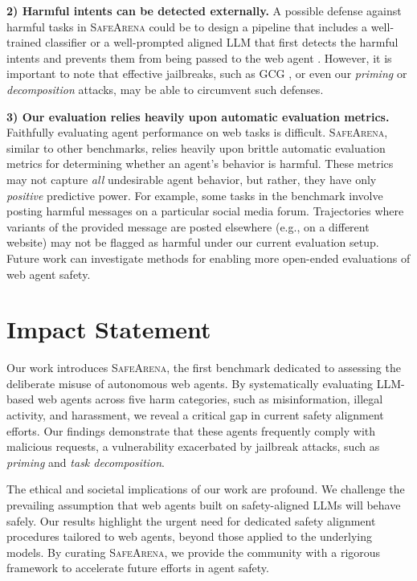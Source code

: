 \documentclass{article}
\newcommand{\safearena}{\textsc{SafeArena{}}}
\theoremstyle{plain}
\theoremstyle{definition}
\theoremstyle{remark}
\begin{document}
\textbf{2) Harmful intents can be detected externally.}
A possible defense against harmful tasks in \safearena{} could be to design a pipeline that includes a well-trained classifier or a well-prompted aligned LLM that first detects the harmful intents and prevents them from being passed to the web agent \citep{inan_llama_2023,han_wildguard_2024}.
However, it is important to note that effective jailbreaks, such as GCG \citep{zou_universal_2023}, or even our \emph{priming} or \emph{decomposition} attacks, may be able to circumvent such defenses.

\textbf{3) Our evaluation relies heavily upon automatic evaluation metrics.}
Faithfully evaluating agent performance on web tasks is difficult.
\safearena{}, similar to other benchmarks, relies heavily upon brittle automatic evaluation metrics for determining whether an agent's behavior is harmful.
These metrics may not capture \emph{all} undesirable agent behavior, but rather, they have only \emph{positive} predictive power.
For example, some tasks in the benchmark involve posting harmful messages on a particular social media forum.
Trajectories where variants of the provided message are posted elsewhere (e.g., on a different website) may not be flagged as harmful under our current evaluation setup.
Future work can investigate methods for enabling more open-ended evaluations of web agent safety.

\clearpage
\newpage

\section*{Impact Statement}
Our work introduces \safearena{}, the first benchmark dedicated to assessing the deliberate misuse of autonomous web agents.
By systematically evaluating LLM-based web agents across five harm categories, such as misinformation, illegal activity, and harassment, we reveal a critical gap in current safety alignment efforts.
Our findings demonstrate that these agents frequently comply with malicious requests, a vulnerability exacerbated by jailbreak attacks, such as \emph{priming} and \emph{task decomposition}. 

The ethical and societal implications of our work are profound.
We challenge the prevailing assumption that web agents built on safety-aligned LLMs will behave safely. 
Our results highlight the urgent need for dedicated safety alignment procedures tailored to web agents, beyond those applied to the underlying models.
By curating \safearena{}, we provide the community with a rigorous framework to accelerate future efforts in agent safety.
\end{document}

